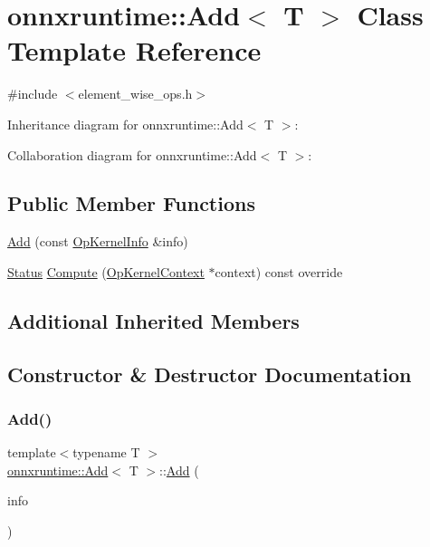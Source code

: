 \hypertarget{classonnxruntime_1_1Add}{}\section{onnxruntime\+:\+:Add$<$ T $>$ Class Template Reference}
\label{classonnxruntime_1_1Add}


{\ttfamily \#include $<$element\+\_\+wise\+\_\+ops.\+h$>$}



Inheritance diagram for onnxruntime\+:\+:Add$<$ T $>$\+:


Collaboration diagram for onnxruntime\+:\+:Add$<$ T $>$\+:
\subsection*{Public Member Functions}
\begin{DoxyCompactItemize}
\item 
\mbox{\hyperlink{classonnxruntime_1_1Add_ab66bc7b29b70a9d74eec01a10e33100b}{Add}} (const \mbox{\hyperlink{classonnxruntime_1_1OpKernelInfo}{Op\+Kernel\+Info}} \&info)
\item 
\mbox{\hyperlink{classonnxruntime_1_1common_1_1Status}{Status}} \mbox{\hyperlink{classonnxruntime_1_1Add_af637c6374902c81cf0e341029a750630}{Compute}} (\mbox{\hyperlink{classonnxruntime_1_1OpKernelContext}{Op\+Kernel\+Context}} $\ast$context) const override
\end{DoxyCompactItemize}
\subsection*{Additional Inherited Members}


\subsection{Constructor \& Destructor Documentation}
\mbox{\label{classonnxruntime_1_1Add_ab66bc7b29b70a9d74eec01a10e33100b}} 
\subsubsection{\texorpdfstring{Add()}{Add()}}
{\footnotesize\ttfamily template$<$typename T $>$ \\
\mbox{\hyperlink{classonnxruntime_1_1Add}{onnxruntime\+::\+Add}}$<$ T $>$\+::\mbox{\hyperlink{classonnxruntime_1_1Add}{Add}} (\begin{DoxyParamCaption}\item[{const \mbox{\hyperlink{classonnxruntime_1_1OpKernelInfo}{Op\+Kernel\+Info}} \&}]{info }\end{DoxyParamCaption})\hspace{0.3cm}{\ttfamily [inline]}}



